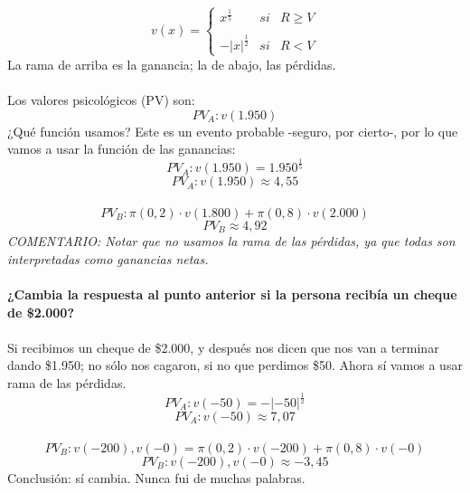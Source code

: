 \documentclass{article}
\begin{document}
        \[v(x) = \left\{\begin{array}{lcc} x^{\frac{1}{5}} & si & R \geq V \\ \\ -|x|^{\frac{1}{2}} & si & R < V\end{array} \right.\]
        La rama de arriba es la ganancia; la de abajo, las pérdidas.
        \\
        \\
        Los valores psicológicos (PV) son:
        \[PV_{A}: v(1.950)\]
        ¿Qué función usamos? Este es un evento probable -seguro, por cierto-, por lo que vamos a usar la función de las ganancias:
        \[PV_{A}: v(1.950) = 1.950^{\frac{1}{5}}\]
        \[PV_{A}: v(1.950) \approx 4,55\]
        \\
        \[PV_{B}: \pi(0,2) \cdot v(1.800) + \pi(0,8) \cdot v(2.000)\]
        \[PV_{B} \approx 4,92\]
        \textit{COMENTARIO: Notar que no usamos la rama de las pérdidas, ya que todas son interpretadas como ganancias netas.}
        \\
        \\
        \textbf{¿Cambia la respuesta al punto anterior si la persona recibía un cheque de \$2.000?}
        \\
        \\
        Si recibimos un cheque de \$2.000, y después nos dicen que nos van a terminar dando \$1.950; no sólo nos cagaron, si no que perdimos \$50. Ahora sí vamos a usar rama de las pérdidas.
        \\
        \[PV_{A}: v(-50) = -|-50|^{\frac{1}{2}}\]
        \[PV_{A}: v(-50) \approx 7,07\]
        \\
        \[PV_{B}: v(-200), v(-0) = \pi(0,2) \cdot v(-200) + \pi(0,8) \cdot v(-0)\]
        \[PV_{B}: v(-200), v(-0) \approx -3,45\]
        Conclusión: sí cambia. Nunca fui de muchas palabras.
\end{document}
